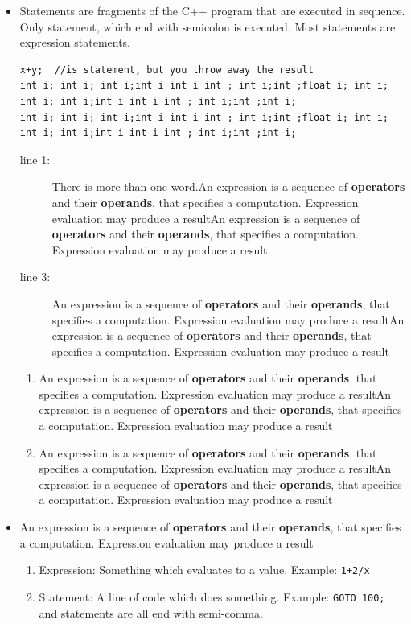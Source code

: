 \documentclass[a4paper,11pt,twoside]{book}
\begin{document}
\begin{itemize}
    \item Statements are fragments of the C++ program that are executed in sequence. Only statement, which end with semicolon is executed. Most statements are expression statements. 
\begin{lstlisting}
x+y;  //is statement, but you throw away the result
int i; int i; int i;int i int i int ; int i;int ;float i; int i; int i; int i;int i int i int ; int i;int ;int i;
int i; int i; int i;int i int i int ; int i;int ;float i; int i; int i; int i;int i int i int ; int i;int ;int i;
\end{lstlisting}
\begin{description}
	\item[line 1:] There is more than one word.An expression is a sequence of \textbf{operators} and their \textbf{operands}, that specifies a computation. Expression evaluation may produce a resultAn expression is a sequence of \textbf{operators} and their \textbf{operands}, that specifies a computation. Expression evaluation may produce a result
	\item[line 3:] An expression is a sequence of \textbf{operators} and their \textbf{operands}, that specifies a computation. Expression evaluation may produce a resultAn expression is a sequence of \textbf{operators} and their \textbf{operands}, that specifies a computation. Expression evaluation may produce a result
\end{description}
\begin{enumerate}
	\item An expression is a sequence of \textbf{operators} and their \textbf{operands}, that specifies a computation. Expression evaluation may produce a resultAn expression is a sequence of \textbf{operators} and their \textbf{operands}, that specifies a computation. Expression evaluation may produce a result
	
	\item An expression is a sequence of \textbf{operators} and their \textbf{operands}, that specifies a computation. Expression evaluation may produce a resultAn expression is a sequence of \textbf{operators} and their \textbf{operands}, that specifies a computation. Expression evaluation may produce a result
\end{enumerate}
	\item An expression is a sequence of \textbf{operators} and their \textbf{operands}, that specifies a computation. Expression evaluation may produce a result

    \begin{enumerate}
    	\item Expression: Something which evaluates to a value. Example: \texttt{1+2/x}
    	\item Statement: A line of code which does something. Example: \texttt{GOTO 100;} and statements are all end with semi-comma.
    \end{enumerate}


\end{itemize}
\end{document}
